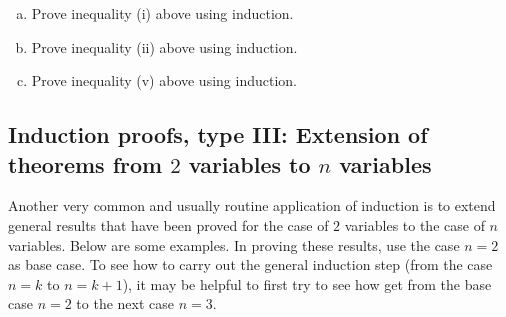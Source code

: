 \begin{exercise}{}
\begin{enumerate}[(a)]
\item
Prove inequality (i) above using induction.
\item
Prove inequality (ii) above using induction.
\item
Prove inequality (v) above using induction.
\end{enumerate}
\end{exercise}

%
%
%
%


\subsection*{Induction proofs, type III:
Extension of theorems from $2$ variables to $n$ variables}
Another very common and usually routine application of induction is to
extend general results that have been proved for the case of $2$
variables to the case of $n$ variables.  Below are some examples.
In proving these results, use the case $n=2$ as base case. To see how to
carry out the general induction step (from the case $n=k$ to
$n=k+1$), it may be  helpful to first try to see how get from the base
case $n=2$ to the next case $n=3$.
\medskip

